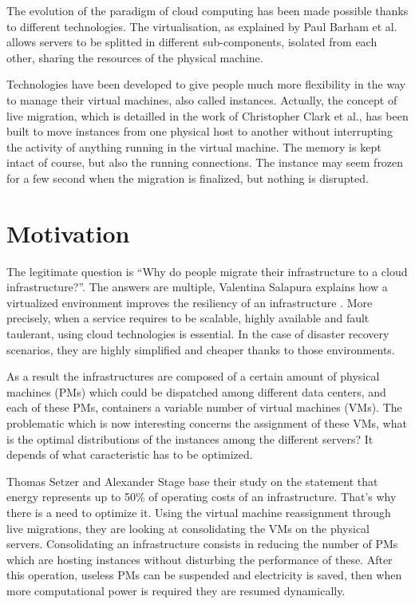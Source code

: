 \documentclass[a4paper,11pt]{article}
\begin{document}
The evolution of the paradigm of cloud computing has been made possible thanks
to different technologies. The virtualisation, as explained by Paul Barham et
al.\cite{virtualisation} allows servers to be splitted in different
sub-components, isolated from each other, sharing the resources of the physical
machine. 

Technologies have been developed to give people much more flexibility
in the way to manage their virtual machines, also called instances. Actually,
the concept of live migration, which is detailled in the work of Christopher
Clark et al.\cite{livemigration}, has been built to move instances from one
physical host to another without interrupting the activity of anything running
in the virtual machine. The memory is kept intact of course, but also the
running connections.  The instance may seem frozen for a few second when the
migration is finalized, but nothing is disrupted.

\section{Motivation}

The legitimate question is ``Why do people migrate their infrastructure to a
cloud infrastructure?''. The answers are multiple, Valentina Salapura explains
how a virtualized environment improves the resiliency of an
infrastructure \cite{virtresiliency}. More precisely, when a service requires
to be scalable, highly available and fault taulerant, using cloud technologies
is essential. In the case of disaster recovery scenarios, they are highly
simplified and cheaper thanks to those environments.

As a result the infrastructures are composed of a certain amount of physical
machines (PMs) which could be dispatched among different data centers, and each
of these PMs, containers a variable number of virtual machines (VMs). The
problematic which is now interesting concerns the assignment of these VMs, what
is the optimal distributions of the instances among the different servers? It
depends of what caracteristic has to be optimized.

Thomas Setzer and Alexander Stage base their study on the statement that energy
represents up to 50\% of operating costs of an infrastructure. That's why there
is a need to optimize it. Using the virtual machine reassignment through live
migrations, they are looking at consolidating the VMs on the physical servers.
Consolidating an infrastructure consists in reducing the number of PMs which
are hosting instances without disturbing the performance of these.  After this
operation, useless PMs can be suspended and electricity is saved, then when
more computational power is required they are resumed dynamically.
\end{document}
